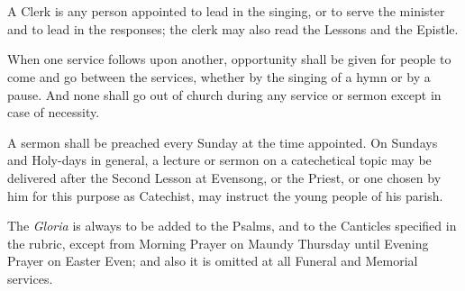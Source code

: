 \chapter[Certain Notes]{}




A Clerk is any person appointed to lead in the singing, or to serve the minister and to lead in the responses; the clerk may also read the Lessons and the Epistle.

When one service follows upon another, opportunity shall be given for people to come and go between the services, whether by the singing of a hymn or by a pause. And none shall go out of church during any service or sermon except in case of necessity.

A sermon shall be preached every Sunday at the time appointed. On Sundays and Holy-days in general, a lecture or sermon on a catechetical topic may be delivered after the Second Lesson at Evensong, or the Priest, or one chosen by him for this purpose as Catechist, may instruct the young people of his parish.

The \emph{Gloria} is always to be added to the Psalms, and to the Canticles specified in the rubric, except from Morning Prayer on Maundy Thursday until Evening Prayer on Easter Even; and also it is omitted at all Funeral and Memorial services.

